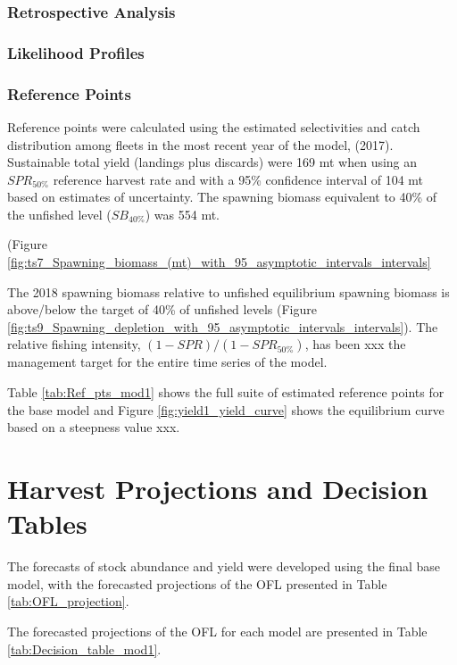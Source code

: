 \documentclass[12pt,]{article}
\begin{document}
\subsubsection{Retrospective Analysis}\label{retrospective-analysis}

\subsubsection{Likelihood Profiles}\label{likelihood-profiles}

\subsubsection{Reference Points}\label{reference-points-1}

Reference points were calculated using the estimated selectivities and
catch distribution among fleets in the most recent year of the model,
(2017). Sustainable total yield (landings plus discards) were 169 mt
when using an \(SPR_{50\%}\) reference harvest rate and with a 95\%
confidence interval of 104 mt based on estimates of uncertainty. The
spawning biomass equivalent to 40\% of the unfished level
(\(SB_{40\%}\)) was 554 mt.

(Figure
\ref{fig:ts7_Spawning_biomass_(mt)_with_95_asymptotic_intervals_intervals}

The 2018 spawning biomass relative to unfished equilibrium spawning
biomass is above/below the target of 40\% of unfished levels (Figure
\ref{fig:ts9_Spawning_depletion_with_95_asymptotic_intervals_intervals}).
The relative fishing intensity, \((1-SPR)/(1-SPR_{50\%})\), has been xxx
the management target for the entire time series of the model.

Table \ref{tab:Ref_pts_mod1} shows the full suite of estimated reference
points for the base model and Figure \ref{fig:yield1_yield_curve} shows
the equilibrium curve based on a steepness value xxx.

\section{Harvest Projections and Decision
Tables}\label{harvest-projections-and-decision-tables}

The forecasts of stock abundance and yield were developed using the
final base model, with the forecasted projections of the OFL presented
in Table \ref{tab:OFL_projection}.

The forecasted projections of the OFL for each model are presented in
Table \ref{tab:Decision_table_mod1}.
\end{document}
